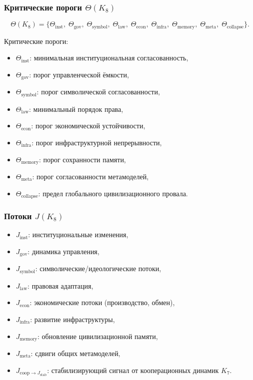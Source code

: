 \subsubsection{Критические пороги \texorpdfstring{$\Theta(K_8)$}{$\Theta(K_8)$}}

\[
\Theta(K_8)=
\{
\Theta_{\mathrm{inst}},\;
\Theta_{\mathrm{gov}},\;
\Theta_{\mathrm{symbol}},\;
\Theta_{\mathrm{law}},\;
\Theta_{\mathrm{econ}},\;
\Theta_{\mathrm{infra}},\;
\Theta_{\mathrm{memory}},\;
\Theta_{\mathrm{meta}},\;
\Theta_{\mathrm{collapse}}
\}.
\]

Критические пороги:
\begin{itemize}
    \item $\Theta_{\mathrm{inst}}$: минимальная институциональная согласованность,
    \item $\Theta_{\mathrm{gov}}$: порог управленческой ёмкости,
    \item $\Theta_{\mathrm{symbol}}$: порог символической согласованности,
    \item $\Theta_{\mathrm{law}}$: минимальный порядок права,
    \item $\Theta_{\mathrm{econ}}$: порог экономической устойчивости,
    \item $\Theta_{\mathrm{infra}}$: порог инфраструктурной непрерывности,
    \item $\Theta_{\mathrm{memory}}$: порог сохранности памяти,
    \item $\Theta_{\mathrm{meta}}$: порог согласованности метамоделей,
    \item $\Theta_{\mathrm{collapse}}$: предел глобального цивилизационного провала.
\end{itemize}

\subsubsection{Потоки \texorpdfstring{$J(K_8)$}{$J(K_8)$}}

\begin{itemize}
    \item $J_{\mathrm{inst}}$: институциональные изменения,
    \item $J_{\mathrm{gov}}$: динамика управления,
    \item $J_{\mathrm{symbol}}$: символические/идеологические потоки,
    \item $J_{\mathrm{law}}$: правовая адаптация,
    \item $J_{\mathrm{econ}}$: экономические потоки (производство, обмен),
    \item $J_{\mathrm{infra}}$: развитие инфраструктуры,
    \item $J_{\mathrm{memory}}$: обновление цивилизационной памяти,
    \item $J_{\mathrm{meta}}$: сдвиги общих метамоделей,
    \item $J_{\mathrm{coop}\to J_{\mathrm{stab}}}$: стабилизирующий сигнал от кооперационных динамик $K_7$.
\end{itemize}

